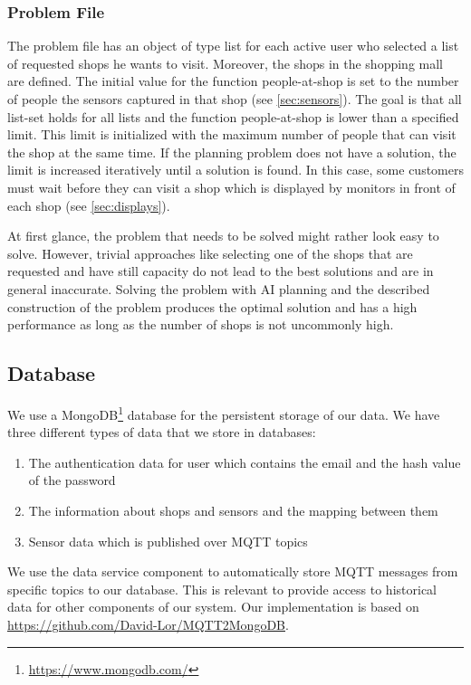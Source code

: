 \documentclass[runningheads]{llncs}
\begin{document}
\subsubsection{Problem File}
The problem file has an object of type list for each active user who selected a list of requested shops he wants to visit. Moreover, the shops in the shopping mall are defined. The initial value for the function people-at-shop is set to the number of people the sensors captured in that shop (see \cref{sec:sensors}). The goal is that all list-set holds for all lists and the function people-at-shop is lower than a specified limit. This limit is initialized with the maximum number of people that can visit the shop at the same time. If the planning problem does not have a solution, the limit is increased iteratively until a solution is found. In this case, some customers must wait before they can visit a shop which is displayed by monitors in front of each shop (see \cref{sec:displays}). 

At first glance, the problem that needs to be solved might rather look easy to solve. However, trivial approaches like selecting one of the shops that are requested and have still capacity do not lead to the best solutions and are in general inaccurate. Solving the problem with AI planning and the described construction of the problem produces the optimal solution and has a high performance as long as the number of shops is not uncommonly high.


\subsection{Database}
We use a MongoDB\footnote{\url{https://www.mongodb.com/}} database for the persistent storage of our data.
We have three different types of data that we store in databases:
\begin{enumerate}
    \item The authentication data for user which contains the email and the hash value of the password
    \item The information about shops and sensors and the mapping between them
    \item Sensor data which is published over MQTT topics
\end{enumerate}

We use the data service component to automatically store MQTT messages from specific topics to our database.
This is relevant to provide access to historical data for other components of our system.
Our implementation is based on \url{https://github.com/David-Lor/MQTT2MongoDB}.
\end{document}
